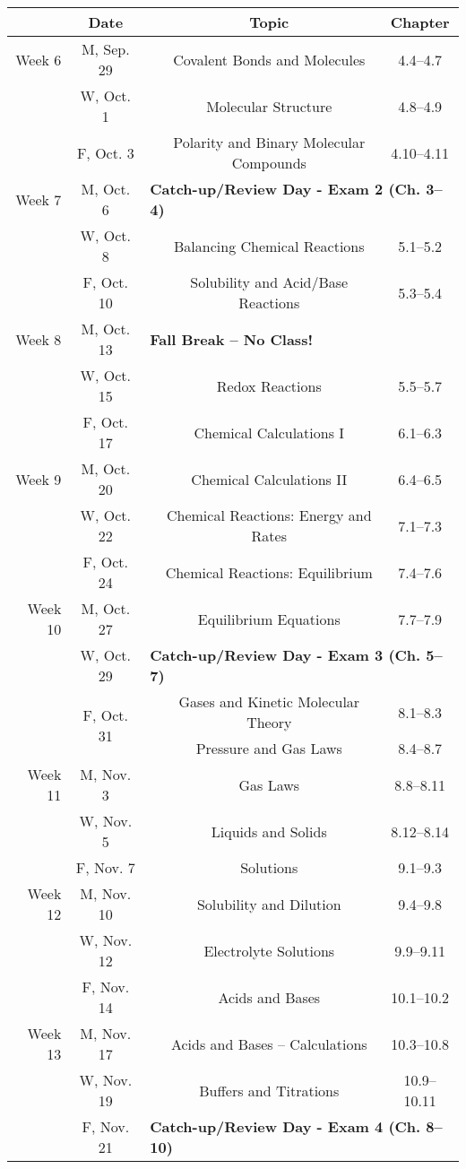 \documentclass[12pt, letterpaper]{article}
\begin{document}
\begin{tabular}{rcccc}
& Date && Topic & Chapter\\
\midrule
Week 6 & M, Sep. 29&& Covalent Bonds and Molecules & 4.4--4.7\\
& W, Oct. 1&& Molecular Structure & 4.8--4.9\\
& F, Oct. 3&& Polarity and Binary Molecular Compounds & 4.10--4.11\\
\midrule
Week 7 & M, Oct. 6& \multicolumn{3}{l}{\textbf{Catch-up/Review Day - Exam 2 (Ch. 3--4)}}\\
& W, Oct. 8&& Balancing Chemical Reactions & 5.1--5.2\\
& F, Oct. 10&& Solubility and Acid/Base Reactions & 5.3--5.4\\
\midrule
Week 8 & M, Oct. 13& \multicolumn{3}{l}{\textbf{Fall Break -- No Class!}}\\
& W, Oct. 15&& Redox Reactions & 5.5--5.7\\
& F, Oct. 17&& Chemical Calculations I & 6.1--6.3\\
\midrule
Week 9 & M, Oct. 20&& Chemical Calculations II & 6.4--6.5\\
& W, Oct. 22&& Chemical Reactions: Energy and Rates & 7.1--7.3\\
& F, Oct. 24&& Chemical Reactions: Equilibrium & 7.4--7.6\\
\midrule
Week 10 & M, Oct. 27&& Equilibrium Equations & 7.7--7.9\\
& W, Oct. 29& \multicolumn{3}{l}{\textbf{Catch-up/Review Day - Exam 3 (Ch. 5--7)}}\\
& \multirow{2}{*}{F, Oct. 31}& & Gases and Kinetic Molecular Theory & 8.1--8.3\\
& & & Pressure and Gas Laws & 8.4--8.7\\
\midrule
Week 11 & M, Nov. 3&& Gas Laws & 8.8--8.11\\
& W, Nov. 5&& Liquids and Solids & 8.12--8.14\\
& F, Nov. 7&& Solutions & 9.1--9.3\\
\midrule
Week 12 & M, Nov. 10&& Solubility and Dilution & 9.4--9.8\\
& W, Nov. 12&& Electrolyte Solutions & 9.9--9.11\\
& F, Nov. 14&& Acids and Bases & 10.1--10.2\\
\midrule
Week 13 & M, Nov. 17&& Acids and Bases -- Calculations & 10.3--10.8\\
& W, Nov. 19&& Buffers and Titrations & 10.9--10.11\\
& F, Nov. 21& \multicolumn{3}{l}{\textbf{Catch-up/Review Day - Exam 4 (Ch. 8--10)}}\\
\end{tabular}
\end{document}
